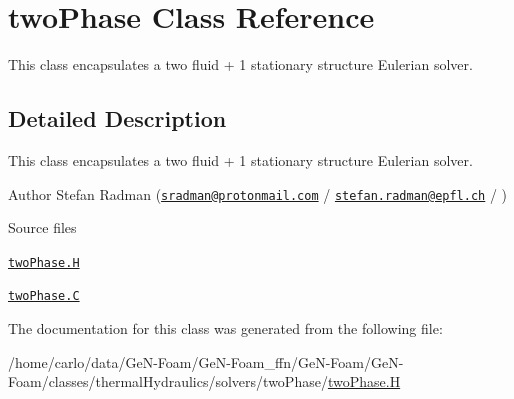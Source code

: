 \hypertarget{classFoam_1_1twoPhase}{}\section{two\+Phase Class Reference}
\label{classFoam_1_1twoPhase}


This class encapsulates a two fluid + 1 stationary structure Eulerian solver.  




\subsection{Detailed Description}
This class encapsulates a two fluid + 1 stationary structure Eulerian solver. 

\label{_Description}%
 Author Stefan Radman (\href{mailto:sradman@protonmail.com}{\tt sradman@protonmail.\+com} / \href{mailto:stefan.radman@epfl.ch}{\tt stefan.\+radman@epfl.\+ch} / )

\begin{DoxyParagraph}{Source files}

\begin{DoxyItemize}
\item \href{../../../home/carlo/data/GeN-Foam/GeN-Foam_ffn/GeN-Foam/GeN-Foam/classes/thermalHydraulics/solvers/twoPhase/twoPhase.H}{\tt two\+Phase.\+H} 
\item \href{../../../home/carlo/data/GeN-Foam/GeN-Foam_ffn/GeN-Foam/GeN-Foam/classes/thermalHydraulics/solvers/twoPhase/twoPhase.C}{\tt two\+Phase.\+C} 
\end{DoxyItemize}
\end{DoxyParagraph}


The documentation for this class was generated from the following file\+:\begin{DoxyCompactItemize}
\item 
/home/carlo/data/\+Ge\+N-\/\+Foam/\+Ge\+N-\/\+Foam\+\_\+ffn/\+Ge\+N-\/\+Foam/\+Ge\+N-\/\+Foam/classes/thermal\+Hydraulics/solvers/two\+Phase/\hyperlink{twoPhase_8H}{two\+Phase.\+H}\end{DoxyCompactItemize}

